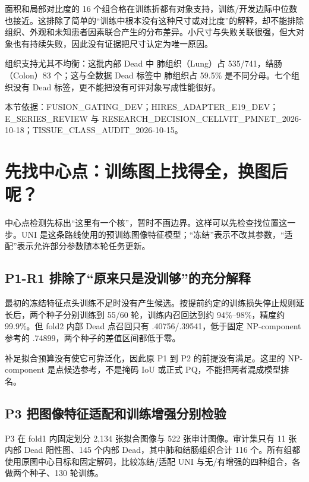 \documentclass[UTF8,zihao=-4,fontset=windows]{ctexart}
\newcommand{\src}[1]{\par{\footnotesize\color{gray}本节依据：#1}\par}
\begin{document}
面积和局部对比度的 16 个组合格在训练折都有对象支持，训练/开发边际中位数也接近。这排除了简单的“训练中根本没有这种尺寸或对比度”的解释，却不能排除组织、外观和未知患者因素联合产生的分布差异。小尺寸与失败关联很强，但大对象也有持续失败，因此没有证据把尺寸认定为唯一原因。

组织支持尤其不均衡：这批内部 Dead 中 肺组织（Lung）占 535/741，结肠（Colon）83 个；这与全数据 Dead 标签中 肺组织占 59.5\% 是不同分母。七个组织没有 Dead 标签，更不能把没有可评对象写成性能很好。

\src{FUSION\_GATING\_DEV；HIRES\_\allowbreak{}ADAPTER\_\allowbreak{}E19\_\allowbreak{}DEV；E\_\allowbreak{}SERIES\_\allowbreak{}REVIEW 与 RESEARCH\_\allowbreak{}DECISION\_\allowbreak{}CELLVIT\_\allowbreak{}PMNET\_\allowbreak{}2026-10-18；TISSUE\_\allowbreak{}CLASS\_\allowbreak{}AUDIT\_\allowbreak{}2026-10-15。}

\section{先找中心点：训练图上找得全，换图后呢？}

中心点检测先标出“这里有一个核”，暂时不画边界。这样可以先检查找位置这一步。UNI 是这条路线使用的预训练图像特征模型；“冻结”表示不改其参数，“适配”表示允许部分参数随本轮任务更新。

\subsection{P1-R1 排除了“原来只是没训够”的充分解释}

最初的冻结特征点头训练不足时没有产生候选。按提前约定的训练损失停止规则延长后，两个种子分别训练到 55/60 轮，训练内召回达到约 94\%--98\%，精度约 99.9\%。但 fold2 内部 Dead 点召回只有 .40756/.39541，低于固定 NP-component 参考的 .74899，两个种子的差值区间都低于零。

补足拟合预算没有使它可靠泛化，因此原 P1 到 P2 的前提没有满足。这里的 NP-component 是点候选参考，不是掩码 IoU 或正式 PQ，不能把两者混成模型排名。

\subsection{P3 把图像特征适配和训练增强分别检验}

P3 在 fold1 内固定划分 2,134 张拟合图像与 522 张审计图像。审计集只有 11 张内部 Dead 阳性图、145 个内部 Dead，其中肺和结肠组织合计 116 个。所有组都使用原图中心目标和固定解码，比较冻结/适配 UNI 与无/有增强的四种组合，各做两个种子、130 轮训练。
\end{document}
